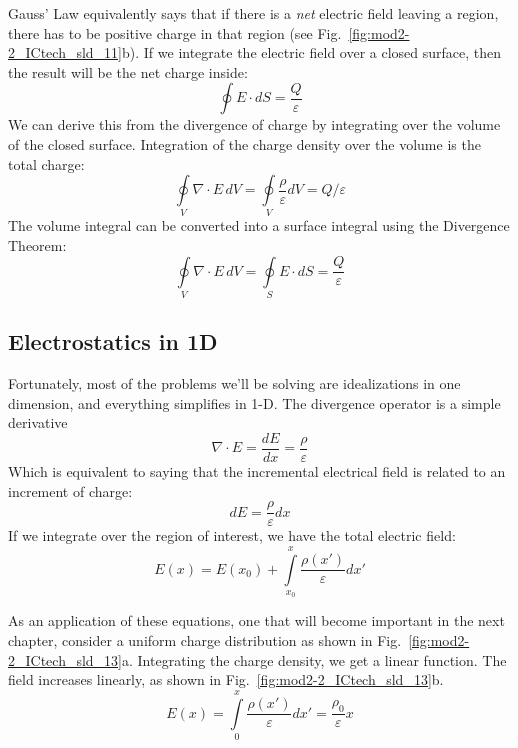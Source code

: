 Gauss’ Law equivalently says that if there is a \textit{net} electric field leaving a region, there has to be positive charge in that region (see Fig.~\ref{fig:mod2-2_ICtech_sld_11}b).   If we integrate the electric field over a closed surface, then the result will be the net charge inside:
\begin{equation}
	\oint {E \cdot dS = \frac{Q}{\varepsilon }} 
\end{equation}
%
We can derive this from the divergence of charge by integrating over the volume of the closed surface.  Integration of the charge density over the volume is the total charge:
% 
\begin{equation}
	\oint\limits_V {\nabla  \cdot E\,dV = } \oint\limits_V {\frac{\rho }{\varepsilon }dV = Q/\varepsilon } 
\end{equation}
The volume integral can be converted into a surface integral using the Divergence Theorem:
\begin{equation} 
	\oint\limits_V {\nabla  \cdot E\,dV = } \oint\limits_S {E \cdot dS = } \frac{Q}{\varepsilon } 
\end{equation}

\subsection{Electrostatics in 1D}

Fortunately, most of the problems we'll be solving are idealizations in one dimension, and everything simplifies in 1-D.  The divergence operator is a simple derivative
\begin{equation} 
	\nabla  \cdot E = \frac{{dE}}{{dx}} = \frac{\rho }{\varepsilon } 
\end{equation}
%
Which is equivalent to saying that the incremental electrical field is related to an increment of charge:
\begin{equation} 
	dE = \frac{\rho }{\varepsilon }dx 
\end{equation}
If we integrate over the region of interest, we have the total electric field:
\begin{equation} 
	E(x) = E({x_0}) + \int\limits_{{x_0}}^x {\frac{{\rho (x')}}{\varepsilon }} dx'
\end{equation}

As an application of these equations, one that will become important in the next chapter, consider a uniform charge distribution as shown in Fig.~\ref{fig:mod2-2_ICtech_sld_13}a.  Integrating the charge density, we get a linear function.  The field increases linearly, as shown in Fig.~\ref{fig:mod2-2_ICtech_sld_13}b.
%
\begin{equation} 
E(x) = \int\limits_0^x {\frac{{\rho (x')}}{\varepsilon }} dx' = \frac{{{\rho _0}}}{\varepsilon }x 
\end{equation}
 

